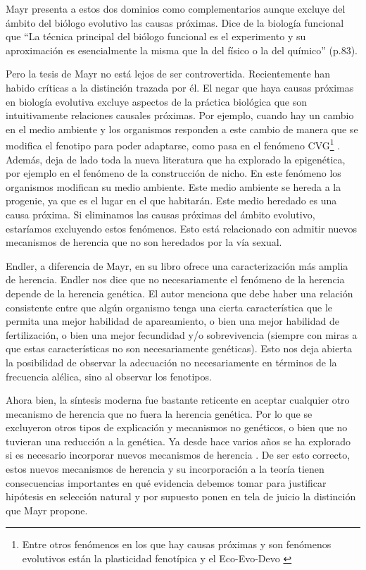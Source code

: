 Mayr presenta a estos dos dominios como complementarios aunque excluye del ámbito del biólogo evolutivo las causas próximas. Dice de la biología funcional que ``La técnica principal del biólogo funcional es el experimento y su aproximación es esencialmente la misma que la del físico o la del químico'' (p.83).

Pero la tesis de Mayr no está lejos de ser controvertida. Recientemente han habido críticas a la distinción trazada por él. El negar que haya causas próximas en biología evolutiva excluye aspectos de la práctica biológica que son intuitivamente relaciones causales próximas. Por ejemplo, cuando hay un cambio en el medio ambiente y los organismos responden a este cambio de manera que se modifica el fenotipo para poder adaptarse, como pasa en el fenómeno CVG\footnote{Entre otros fenómenos en los que hay causas próximas y son fenómenos evolutivos están la plasticidad fenotípica \cite{WESTEBERHARD20082701} y el Eco-Evo-Devo \cite{PfenningEco-Evo-Devo}} \cite{CVG}. Además, deja de lado toda la nueva literatura que ha explorado la epigenética, por ejemplo en el fenómeno de la construcción de nicho. En este fenómeno los organismos modifican su medio ambiente. Este medio ambiente se hereda a la progenie, ya que es el lugar en el que habitarán. Este medio heredado es una causa próxima. Si eliminamos las causas próximas del ámbito evolutivo, estaríamos excluyendo estos fenómenos. Esto está relacionado con admitir nuevos mecanismos de herencia que no son heredados por la vía sexual.

Endler, a diferencia de Mayr, en su libro \citeyear{Endler1986} ofrece una caracterización más amplia de herencia. Endler nos dice que no necesariamente el fenómeno de la herencia depende de la herencia genética. El autor menciona que debe haber una relación consistente entre que algún organismo tenga una cierta característica que le permita una mejor habilidad de apareamiento, o bien una mejor habilidad de fertilización, o bien una mejor fecundidad y/o sobrevivencia (siempre con miras a que estas características no son necesariamente genéticas). Esto nos deja abierta la posibilidad de observar la adecuación no necesariamente en términos de la frecuencia alélica, sino al observar los fenotipos.

Ahora bien, la síntesis moderna fue bastante reticente en aceptar cualquier otro mecanismo de herencia que no fuera la herencia genética. Por lo que se excluyeron otros tipos de explicación y mecanismos no genéticos, o bien que no tuvieran una reducción a la genética. Ya desde hace varios años se ha explorado si es necesario incorporar nuevos mecanismos de herencia \cite{Jablonka2020}. De ser esto correcto, estos nuevos mecanismos de herencia y su incorporación a la teoría tienen consecuencias importantes en qué evidencia debemos tomar para justificar hipótesis en selección natural y por supuesto ponen en tela de juicio la distinción que Mayr propone.

